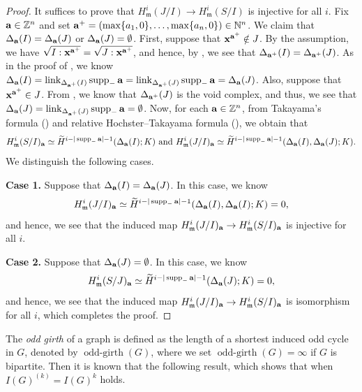 \documentclass[12pt]{amsart}
\theoremstyle{definition}
\theoremstyle{remark}
\DeclareMathOperator{\link}{link}
\DeclareMathOperator{\supp}{supp}
\DeclareMathOperator{\ogirth}{odd-girth}
\begin{document}
\begin{proof}
It suffices to prove that $H_{\mathfrak{m}}^{i}(J/I)\rightarrow H_{\mathfrak{m}}^{i}(S/I)$ is injective for all $i$. Fix ${\bf a}\in\mathbb{Z}^{n}$ and set ${\bf a}^{+}=(\max\{a_{1},0\},\ldots, \max\{a_{n},0\})\in\mathbb{N}^{n}$. We claim that $\Delta_{\bf a}(I)=\Delta_{\bf a}(J)$ or $\Delta_{\bf a}(J)=\emptyset$. First, suppose that ${\bf x}^{\bf a^{+}}\notin J$. By the assumption, we have $\sqrt{I:{\bf x}^{\bf a^{+}}}=\sqrt{J:{\bf x}^{\bf a^{+}}}$, and hence, by \cite[Lemma 2.19]{mnptv2022}, we see that $\Delta_{\bf a^{+}}(I)=\Delta_{\bf a^{+}}(J)$. As in the proof of \cite[Theorem 3.2]{kmt2025}, we know $\Delta_{\bf a}(I)=\link_{\Delta_{\bf a^{+}}(I)}\supp_{-}{\bf a}=\link_{\Delta_{\bf a^{+}}(J)}\supp_{-}{\bf a}=\Delta_{\bf a}(J)$. Also, suppose that ${\bf x}^{\bf a^{+}}\in J$. From \cite[Lemma 2.19]{mnptv2022}, we know that $\Delta_{\bf a^{+}}(J)$ is the void complex, and thus, we see that $\Delta_{\bf a}(J)=\link_{\Delta_{\bf a^{+}}(J)}\supp_{-}{\bf a}=\emptyset$. Now, for each ${\bf a}\in\mathbb{Z}^{n}$, from Takayama's formula (\cite[Theorem 1]{t2005}) and relative Hochster--Takayama formula (\cite[Theorem 3.2]{hm2026}), we obtain that 
$$H_{\mathfrak{m}}^{i}(S/I)_{\bf a}\simeq\widetilde{H}^{i-|\supp_{-}{\bf a}|-1}(\Delta_{\bf a}(I);K)\mbox{ and }H_{\mathfrak{m}}^{i}(J/I)_{\bf a}\simeq\widetilde{H}^{i-|\supp_{-}{\bf a}|-1}(\Delta_{\bf a}(I),\Delta_{\bf a}(J);K).$$We distinguish the following cases. 

{\bf Case 1.} Suppose that $\Delta_{\bf a}(I)=\Delta_{\bf a}(J)$. In this case, we know $$H_{\mathfrak{m}}^{i}(J/I)_{\bf a}\simeq\widetilde{H}^{i-|\supp_{-}{\bf a}|-1}(\Delta_{\bf a}(I),\Delta_{\bf a}(I);K)=0,$$ and hence, we see that the induced map $H_{\mathfrak{m}}^{i}(J/I)_{\bf a}\rightarrow H_{\mathfrak{m}}^{i}(S/I)_{\bf a}$ is injective for all $i$. 

{\bf Case 2.} Suppose that $\Delta_{\bf a}(J)=\emptyset$. In this case, we know $$H_{\mathfrak{m}}^{i}(S/J)_{\bf a}\simeq\widetilde{H}^{i-|\supp_{-}{\bf a}|-1}(\Delta_{\bf a}(J);K)=0,$$ and hence, we see that the induced map $H_{\mathfrak{m}}^{i}(J/I)_{\bf a}\rightarrow H_{\mathfrak{m}}^{i}(S/I)_{\bf a}$ is isomorphism for all $i$,
which completes the proof. 
\end{proof}

The {\it odd girth} of a graph is defined as the length of a shortest induced odd cycle in $G$, denoted by $\ogirth(G)$, where we set $\ogirth(G)=\infty$ if $G$ is bipartite. Then it is known that the following result, which shows that when $I(G)^{(k)}=I(G)^{k}$ holds.  
\end{document}
